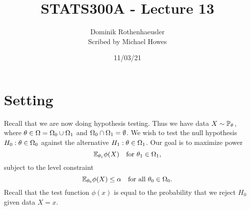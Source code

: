 




\title{STATS300A - Lecture 13}
\author{Dominik Rothenhaeusler\\ Scribed by Michael Howes}
\date{11/03/21}

\pagestyle{fancy}
\fancyhf{}


\maketitle
\tableofcontents
\section{Setting}
Recall that we are now doing hypothesis testing. Thus we have data $X \sim {\mathbb{P}}_{\theta}$, where ${\theta} \in {{\Omega}} = {{\Omega}}_0 \cup {{\Omega}}_1$ and ${{\Omega}}_0 \cap {{\Omega}}_1 = \emptyset$. We wish to test the null hypothesis $H_0 : {\theta} \in {{\Omega}}_0$ against the alternative $H_1 : {\theta} \in {{\Omega}}_1$. Our goal is to maximize power
\[{\mathbb{E}}_{{\theta}_1}\phi(X)~~\text{ for } {\theta}_1 \in {{\Omega}}_1, \]
subject to the level constraint
\[{\mathbb{E}}_{{\theta}_0}\phi(X) \le {\alpha} ~~\text{ for all }{\theta}_0\in{{\Omega}}_0. \]
Recall that the test function $\phi(x)$ is equal to the probability that we reject $H_0$ given data $X=x$.
